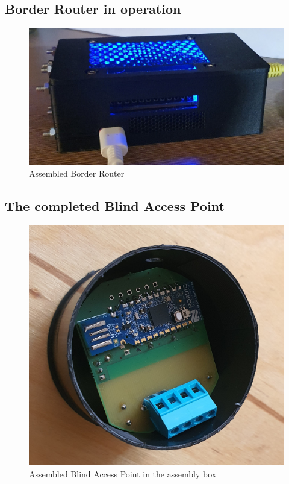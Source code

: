 \subsection{Border Router in operation}
\begin{figure}[!htb]
    \centering
    \includegraphics[width=\textwidth]{img/valosborderrouter.jpg}
    \caption{Assembled Border Router}
    \label{fig:realborderrouter}
\end{figure}

\subsection{The completed Blind Access Point}
\begin{figure}[!htb]
    \centering
    \includegraphics[scale=0.1]{img/realblindaccesspoint.jpg}
    \caption{Assembled Blind Access Point in the assembly box}
    \label{fig:realblindaccesspoint}
\end{figure}

